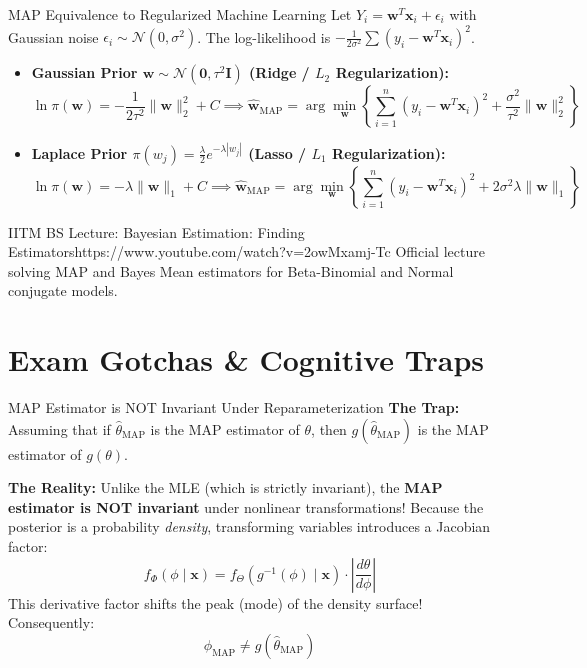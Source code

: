 \begin{theorembox}{MAP Equivalence to Regularized Machine Learning}
Let $Y_i = \mathbf{w}^T \mathbf{x}_i + \epsilon_i$ with Gaussian noise $\epsilon_i \sim \mathcal{N}(0, \sigma^2)$. The log-likelihood is $-\frac{1}{2\sigma^2} \sum (y_i - \mathbf{w}^T \mathbf{x}_i)^2$.
\begin{itemize}
    \item \textbf{Gaussian Prior $\mathbf{w} \sim \mathcal{N}(\mathbf{0}, \tau^2 \mathbf{I})$ (Ridge / $L_2$ Regularization):}
    $$\ln \pi(\mathbf{w}) = -\frac{1}{2\tau^2} \|\mathbf{w}\|_2^2 + C \implies \hat{\mathbf{w}}_{\text{MAP}} = \arg\min_{\mathbf{w}} \left\{ \sum_{i=1}^n (y_i - \mathbf{w}^T \mathbf{x}_i)^2 + \frac{\sigma^2}{\tau^2} \|\mathbf{w}\|_2^2 \right\}$$
    \item \textbf{Laplace Prior $\pi(w_j) = \frac{\lambda}{2} e^{-\lambda |w_j|}$ (Lasso / $L_1$ Regularization):}
    $$\ln \pi(\mathbf{w}) = -\lambda \|\mathbf{w}\|_1 + C \implies \hat{\mathbf{w}}_{\text{MAP}} = \arg\min_{\mathbf{w}} \left\{ \sum_{i=1}^n (y_i - \mathbf{w}^T \mathbf{x}_i)^2 + 2\sigma^2 \lambda \|\mathbf{w}\|_1 \right\}$$
\end{itemize}
\end{theorembox}

\begin{videocard}{IITM BS Lecture: Bayesian Estimation: Finding Estimators}{https://www.youtube.com/watch?v=2owMxamj-Tc}
Official lecture solving MAP and Bayes Mean estimators for Beta-Binomial and Normal conjugate models.
\end{videocard}

\section{Exam Gotchas \& Cognitive Traps}

\begin{trapbox}{MAP Estimator is NOT Invariant Under Reparameterization}
\textbf{The Trap:} Assuming that if $\hat{\theta}_{\text{MAP}}$ is the MAP estimator of $\theta$, then $g(\hat{\theta}_{\text{MAP}})$ is the MAP estimator of $g(\theta)$.

\textbf{The Reality:} Unlike the MLE (which is strictly invariant), the \textbf{MAP estimator is NOT invariant} under nonlinear transformations!
Because the posterior is a probability \emph{density}, transforming variables introduces a Jacobian factor:
$$f_\Phi(\phi \mid \mathbf{x}) = f_\Theta(g^{-1}(\phi) \mid \mathbf{x}) \cdot \left| \frac{d\theta}{d\phi} \right|$$
This derivative factor shifts the peak (mode) of the density surface! Consequently:
$$\hat{\phi}_{\text{MAP}} \neq g(\hat{\theta}_{\text{MAP}})$$
\end{trapbox}

